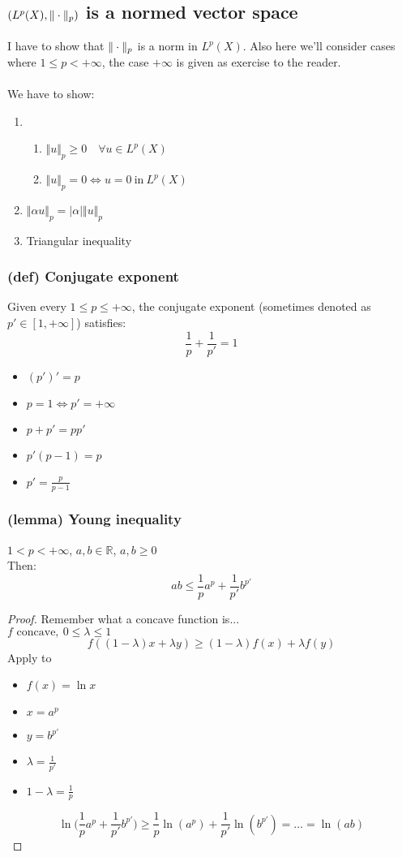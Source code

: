 \subsection{$(L^p(X),\Vert \cdot \Vert_p)$ is a normed vector space}
I have to show that $\Vert \cdot \Vert_p$ is a norm in $L^p(X)$. Also here we'll consider cases where $1\leq p< +\infty$, the case $+\infty$ is given as exercise to the reader.
\\\ \\
We have to show:

\begin{enumerate}
    \item 
        \begin{enumerate}[label=(\alph*)]
            \item $\Vert u\Vert_p\geq 0 \quad \forall u \in L^p(X)$
            \item $\Vert u\Vert_p=0\iff u=0\ \text{in} \ L^p(X)$
        \end{enumerate}
    \item $\Vert \alpha u \Vert_p=|\alpha |\Vert u\Vert_p $
    \item Triangular inequality
\end{enumerate}
\subsubsection{(def) Conjugate exponent}
Given every $1\leq p\leq +\infty$, the conjugate exponent (sometimes denoted as $p'\in [1,+\infty]$) satisfies:
$$\frac 1p +\frac 1{p'}=1$$
\begin{itemize}
    \item $(p')'=p$
    \item $ p=1\iff p'=+\infty$
    \item $p+p'=pp'$
    \item $p'(p-1)=p$
    \item $p'=\frac p{p-1}$
\end{itemize}

\subsubsection{(lemma) Young inequality}
$1<p<+\infty$, $a,b\in \mathbb R$, $a,b\geq 0$\\
Then:
$$ab\leq \frac 1p a^p+\frac 1{p'} b^{p'}$$
\begin{proof}
Remember what a concave function is...\\
$f \text{ concave},\ 0\leq \lambda\leq 1$
$$f((1-\lambda)x+\lambda y)\geq (1-\lambda)f(x)+\lambda f(y)$$
Apply to 
\begin{itemize}
    \item $f(x)=\ln x$
    \item $x=a^p$
    \item $y=b^{p'}$
    \item $\lambda = \frac 1{p'}$
    \item $1-\lambda = \frac 1p$
\end{itemize}
$$\ln\Big(\frac 1p a^p+\frac 1{p'} b^{p'}\Big)\geq \frac 1p \ln(a^p)+\frac 1{p'}\ln(b^{p'})=\dots=\ln(ab)$$
\end{proof}

